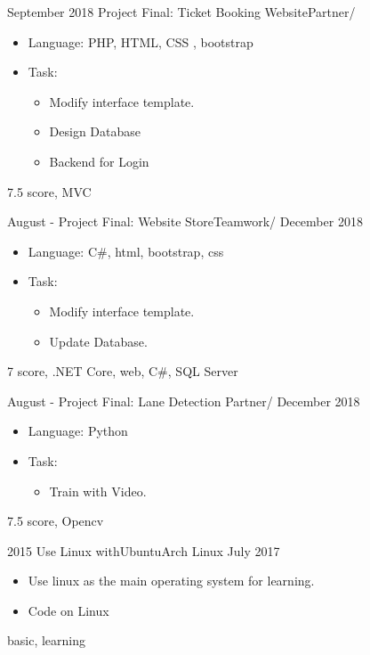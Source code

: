 
\begin{experiences}
	\experience%
		{September 2018}
		{Project Final:  Ticket Booking Website}{Partner}{/}
		{ }
		{
			\begin{itemize}
				\item Language: PHP, HTML, CSS , bootstrap
				\item Task:
					\begin{itemize}
						\item Modify interface template.
						\item Design Database 
						\item Backend for Login
					\end{itemize}
			\end{itemize}
		}
		{7.5 score, MVC}
	\emptySeparator%
	
	\experience%
		{August - }
		{Project Final: Website Store}{Teamwork}{/}
		{December 2018}
		{
			\begin{itemize}
				\item Language: C\#, html, bootstrap, css
				\item Task:
					\begin{itemize}
						\item Modify interface template.
						\item Update Database.
					\end{itemize}
		\end{itemize}
		}
		{{7 score}, {.NET Core}, web, {C\#}, SQL Server}
	\emptySeparator%
	
	\experience%
	{August - }
	{Project Final: Lane Detection }{Partner}{/}
	{December 2018}
	{
		\begin{itemize}
			\item Language: Python
			\item Task:
			\begin{itemize}
				\item Train with Video.
			\end{itemize}
		\end{itemize}
	}
	{{7.5 score}, Opencv}
	\emptySeparator%
	
	\experience%
		{ 2015}
		{Use Linux with}{Ubuntu}{Arch Linux}
		{July 2017}
		{
			\begin{itemize}
				\item Use linux as the main operating system for learning.
				\item Code on Linux
			\end{itemize}
		}
		{basic, {learning}}
	\emptySeparator%

\end{experiences}

